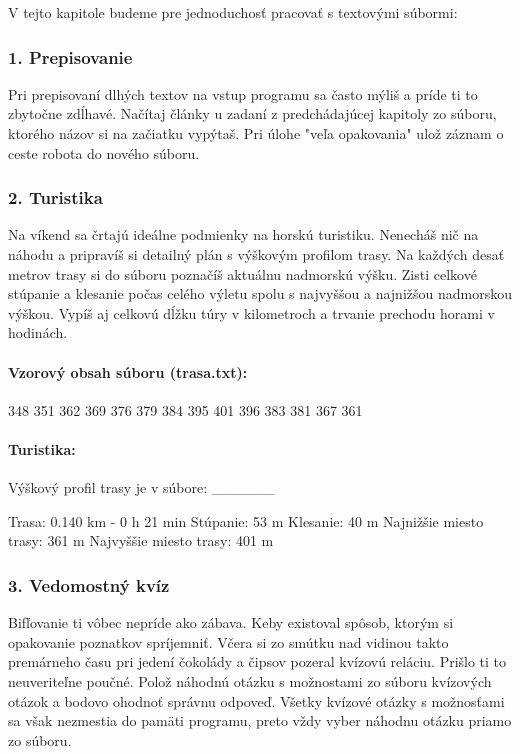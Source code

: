 V tejto kapitole budeme pre jednoduchosť pracovať s textovými súbormi:

\subsubsection*{1. Prepisovanie}
Pri prepisovaní dlhých textov na vstup programu sa často mýliš a príde ti to zbytočne zdĺhavé. Načítaj články u zadaní z predchádajúcej kapitoly zo súboru, ktorého názov si na začiatku vypýtaš. Pri úlohe "veľa opakovania" ulož záznam o ceste robota do nového súboru.


\subsubsection*{2. Turistika}
Na víkend sa črtajú ideálne podmienky na horskú turistiku. Nenecháš nič na náhodu a pripravíš si detailný plán s výškovým profilom trasy. Na každých desať metrov trasy si do súboru poznačíš aktuálnu nadmorskú výšku. Zisti celkové stúpanie a klesanie počas celého výletu spolu s najvyššou a najnižšou nadmorskou výškou. Vypíš aj celkovú dĺžku túry v kilometroch a trvanie prechodu horami v hodinách.

\paragraph{Vzorový obsah súboru (trasa.txt):}

\begin{code}
348
351
362
369
376
379
384
395
401
396
383
381
367
361
\end{code}

\paragraph{Turistika:}

\begin{code}
Výškový profil trasy je v súbore: ______

Trasa: 0.140 km - 0 h 21 min
Stúpanie: 53 m
Klesanie: 40 m
Najnižšie miesto trasy: 361 m
Najvyššie miesto trasy: 401 m
\end{code}

\subsubsection*{3. Vedomostný kvíz}
Bifľovanie ti vôbec nepríde ako zábava. Keby existoval spôsob, ktorým si opakovanie poznatkov spríjemniť. Včera si zo smútku nad vidinou takto premárneho času pri jedení čokolády a čipsov pozeral kvízovú reláciu. Prišlo ti to neuveriteľne poučné. Polož náhodnú otázku s možnostami zo súboru kvízových otázok a bodovo ohodnoť správnu odpoveď. Všetky kvízové otázky s možnosťami sa však nezmestia do pamäti programu, preto vždy vyber náhodnu otázku priamo zo súboru.

